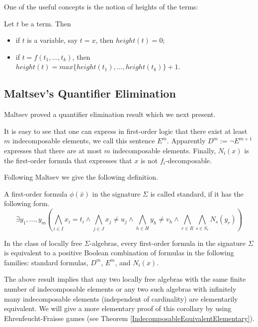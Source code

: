 \documentclass[a4paper,11pt]{article}
\begin{document}
One of the useful concepts is the notion of heights of the terms:
\begin{definition}
Let $t$ be a term. Then 
\begin{itemize}
\item if $t$ is a variable, say $t=x$, then  $height(t)=0$;
\item if $t=f(t_1, \ldots, t_k)$,   then $height(t)=max\{height(t_1),\ldots,height(t_k)\}+1$. 
\end{itemize}
\end{definition}
\subsection{Maltsev's Quantifier Elimination}
Maltsev proved a quantifier elimination result which we next present.

It is easy to see that one can express in first-order logic that there exist at least $m$ indecomposable elements, we call this sentence $E^m$. Apparently $D^m:=\lnot E^{m+1}$ expresses that there are at most $m$ indecomposable elements. Finally, $N_i(x)$ is the first-order formula that expresses that $x$ is not $f_i$-decomposable.   

Following Maltsev we give the following definition. 

\begin{definition}
A first-order formula $\phi(\bar x)$ in the signature $\Sigma$ is called standard, if it has the following form. 
\begin{equation}\label{specialformulas}
			\exists y_1,\ldots,y_m\left(\bigwedge_{i\in I} x_i=t_i\wedge \bigwedge_{j\in J}x_j\neq u_j \wedge\bigwedge_{h\in H}y_h\neq v_h\wedge \bigwedge_{r\in R}\bigwedge_{s\in S_r} N_s(y_r)\right)
		\end{equation}
\end{definition}

\begin{fact}\cite[Theorem 3]{Malcev71}\label{MalcevQE}
In the class of locally free $\Sigma$-algebras, every first-order formula in the signature $\Sigma$ is equivalent to a positive Boolean combination of formulas in the following families: standard formulas, $D^m$, $E^m$, and $N_i(x)$. 
\end{fact}

The above result implies that any two locally free algebras with the same finite number of indecomposable elements or any two such algebras with infinitely many indecomposable elements (independent of cardinality) are elementarily equivalent. We will give a more elementary proof of this corollary by using Ehrenfeucht-Fraisse games (see Theorem \ref{IndecomposableEquivalentElementary}). 
\end{document}
